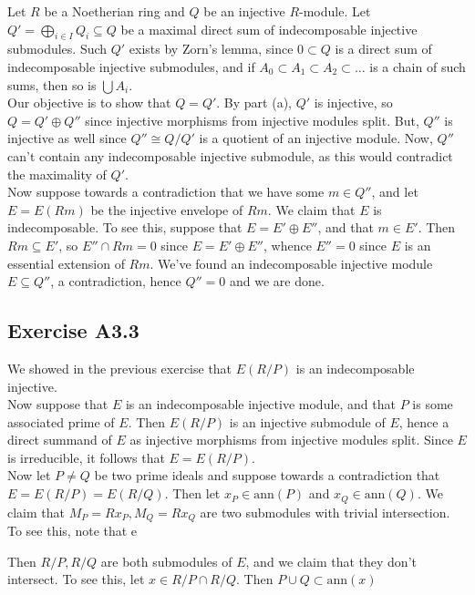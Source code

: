 \documentclass{article}
\theoremstyle{definition}
\newcommand{\ann}{\text{ann}}
\begin{document}
Let $R$ be a Noetherian ring and $Q$ be an injective $R$-module. Let $Q' =
\bigoplus_{i \in I} Q_i \subseteq Q$ be a maximal direct sum of indecomposable
injective submodules. Such $Q'$ exists by Zorn's lemma, since $0 \subset Q$ is
a direct sum of indecomposable injective submodules, and if $A_0 \subset A_1
\subset A_2 \subset \ldots$ is a chain of such sums, then so is $\bigcup A_i$. \\

Our objective is to show that $Q = Q'$. By part (a), $Q'$ is injective, so $Q =
Q' \oplus Q''$ since injective morphisms from injective modules split. But,
$Q''$ is injective as well since $Q'' \cong Q/Q'$ is a quotient of an injective
module. Now, $Q''$ can't contain any indecomposable injective submodule, as 
this would contradict the maximality of $Q'$. \\

Now suppose towards a contradiction that we have some $m \in Q''$, and let $E =
E(Rm)$ be the injective envelope of $Rm$. We claim that $E$ is indecomposable.
To see this, suppose that $E = E' \oplus E''$, and that $m \in E'$. Then $Rm
\subseteq E'$, so $E'' \cap Rm = 0$ since $E = E' \oplus E''$, whence $E'' = 0$
since $E$ is an essential extension of $Rm$. We've found an indecomposable
injective module $E \subseteq Q''$, a contradiction, hence $Q'' = 0$ and we are
done.

\subsection*{Exercise A3.3}

We showed in the previous exercise that $E(R/P)$ is an indecomposable injective. \\

Now suppose that $E$ is an indecomposable injective module, and that $P$ is
some associated prime of $E$. Then $E(R/P)$ is an injective submodule of $E$,
hence a direct summand of $E$ as injective morphisms from injective modules
split. Since $E$ is irreducible, it follows that $E = E(R/P)$. \\

Now let $P \not = Q$ be two prime ideals and suppose towards a contradiction
that $E = E(R/P) = E(R/Q)$. Then let $x_P \in \ann(P)$ and $x_Q \in \ann(Q)$.
We claim that $M_P = Rx_P, M_Q = Rx_Q$ are two submodules with trivial
intersection. To see this, note that e

Then $R/P, R/Q$ are both submodules of $E$,
and we claim that they don't intersect. To see this, let $x \in R/P \cap R/Q$.
Then $P \cup Q \subset \ann(x)$
\end{document}
